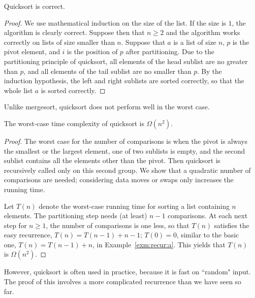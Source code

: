 \begin{Lemma} 
Quicksort is correct.
\end{Lemma}
\begin{proof}
We use mathematical induction on the size of the list. If the size
is $1$, the algorithm is clearly correct. Suppose then that $n\geq 2$
and the algorithm works correctly on lists of size smaller than $n$. Suppose
that $a$ is a list of size $n$, $p$ is the pivot element, and $i$ is the
position of $p$ after partitioning. Due to the partitioning principle of 
quicksort, all elements of the head sublist are no greater than $p$, and all 
elements of the tail sublist are no smaller than $p$. By the induction hypothesis, 
the left and right sublists are sorted correctly, so that the whole list $a$
is sorted correctly.
\end{proof}

Unlike mergesort, quicksort does not perform well in the worst case.

\begin{Lemma}\label{lem:qsort:max} 
The worst-case time complexity of quicksort is \(\Omega(n^2 )\).
\end{Lemma}

\begin{proof}
The worst case for the number of comparisons is when the pivot is always the 
smallest or the largest element, one of two sublists is empty, and the second 
sublist contains all the elements other than the pivot. Then quicksort is 
recursively called only on this second group. We show that a quadratic number 
of comparisons are needed; considering data moves or swaps only increases the 
running time.

Let $T(n)$ denote the worst-case running time for sorting a list containing 
$n$ elements. The partitioning step needs (at least) $n-1$ comparisons. 
At each next step for $n \ge 1$, the number of comparisons is one less, so that
 \(T(n)\) satisfies the easy recurrence, 
\(T(n) = T(n-1) + n-1\); \(T(0)=0\), similar to the basic one, 
\(T(n)=T(n-1)+n\), in Example~\ref{exm:recur:a}. This yields that 
\(T(n)\) is $\Omega(n^{2})$. 
\end{proof}

However, quicksort is often used in practice, because it is fast on ``random" 
input. The proof of this involves a more complicated recurrence than we have 
seen so far.

